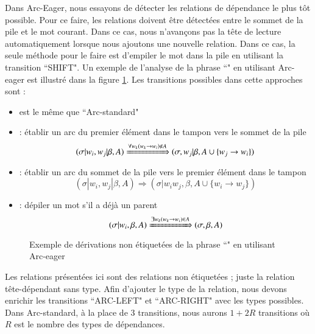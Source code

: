\documentclass{KodeBook}
\begin{document}
Dans Arc-Eager, nous essayons de détecter les relations de dépendance le plus tôt possible. 
Pour ce faire, les relations doivent être détectées entre le sommet de la pile et le mot courant. 
Dans ce cas, nous n'avançons pas la tête de lecture automatiquement lorsque nous ajoutons une nouvelle relation. 
Dans ce cas, la seule méthode pour le faire est d'empiler le mot dans la pile en utilisant la transition ``SHIFT". 
Un exemple de l'analyse de la phrase ``" en utilisant Arc-eager est illustré dans la figure \ref{fig:arc-eager-exp}.
Les transitions possibles dans cette approches sont :
\begin{itemize}
	\item {} est le même que ``Arc-standard"
	
	\item {} : établir un arc du premier élément dans le tampon vers le sommet de la pile
	\[ (\sigma|w_i, w_j|\beta, A) \xRightarrow{\forall w_k (w_k \rightarrow w_i) \notin A}  (\sigma, w_j|\beta, A \cup \{w_j \rightarrow w_i \}) \] 
	
	\item {} : établir un arc du sommet de la pile vers le premier élément dans le tampon
	\[ (\sigma|w_i, w_j|\beta, A) \Rightarrow  (\sigma|w_i w_j, \beta, A \cup \{w_i \rightarrow w_j \}) \] 
	
	\item {} : dépiler un mot s'il a déjà un parent
	\[ (\sigma|w_i, \beta, A) \xRightarrow{\exists w_k (w_k \rightarrow w_i) \in A} (\sigma, \beta, A) \] 
\end{itemize}

\begin{figure}[ht]
	\centering
	\caption[Exemple de dérivations non étiquetées en utilisant Arc-eager]{Exemple de dérivations non étiquetées de la phrase ``" en utilisant Arc-eager \cite{2018-eisenstein}\label{fig:arc-eager-exp}}
\end{figure}

Les relations présentées ici sont des relations non étiquetées ; juste la relation tête-dépendant sans type.
Afin d'ajouter le type de la relation, nous devons enrichir les transitions ``ARC-LEFT" et ``ARC-RIGHT" avec les types possibles. 
Dans Arc-standard, à la place de 3 transitions, nous aurons $1+2R$ transitions où $R$ est le nombre des types de dépendances.
\end{document}
